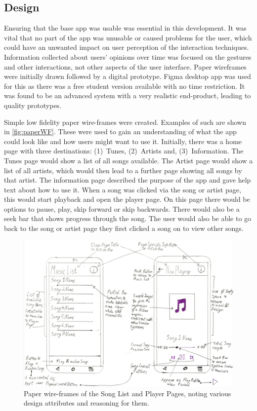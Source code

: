 \documentclass{l4proj}
\begin{document}
\subsection{Design}
Ensuring that the base app was usable was essential in this development. It was vital that no part of the app was unusable or caused problems for the user, which could have an unwanted impact on user perception of the interaction techniques. Information collected about users’ opinions over time was focused on the gestures and other interactions, not other aspects of the user interface. Paper wireframes were initially drawn followed by a digital prototype. Figma desktop app was used for this as there was a free student version available with no time restriction. It was found to be an advanced system with a very realistic end-product, leading to quality prototypes.

Simple low fidelity paper wire-frames were created. Examples of such are shown in \autoref{fig:paperWF}. These were used to gain an understanding of what the app could look like and how users might want to use it. Initially, there was a home page with three destinations: (1)~Tunes, (2)~Artists and, (3)~Information. The Tunes page would show a list of all songs available. The Artist page would show a list of all artists, which would then lead to a further page showing all songs by that artist. The information page described the purpose of the app and gave help text about how to use it. When a song was clicked via the song or artist page, this would start playback and open the player page. On this page there would be options to pause, play, skip forward or skip backwards. There would also be a seek bar that shows progress through the song. The user would also be able to go back to the song or artist page they first clicked a song on to view other songs.

\begin{figure}[h!]
    \centering
    \includegraphics[scale=0.0675]{images/papWF.jpg}
        \caption{Paper wire-frames of the Song List and Player Pages, noting various design attributes and reasoning for them.}
        \label{fig:paperWF}
\end{figure}
\end{document}
